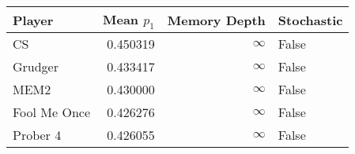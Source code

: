 \begin{tabular}{lrrl}
\toprule
       Player &  Mean $p_1$ &  Memory Depth & Stochastic \\
\midrule
           CS &    0.450319 &            \(\infty\) &      False \\
      Grudger &    0.433417 &            \(\infty\) &      False \\
         MEM2 &    0.430000 &            \(\infty\) &      False \\
 Fool Me Once &    0.426276 &            \(\infty\) &      False \\
     Prober 4 &    0.426055 &            \(\infty\) &      False \\
\bottomrule
\end{tabular}
